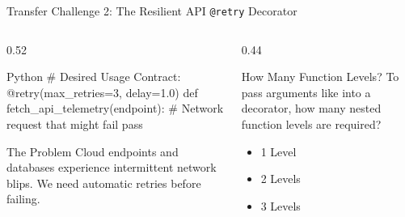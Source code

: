 \begin{frame}[fragile]{Transfer Challenge 2: The Resilient API \texttt{@retry} Decorator}
  \begin{columns}[T,onlytextwidth]
    \begin{column}{0.52\textwidth}
      \begin{CodeBlock}{Python}
# Desired Usage Contract:
@retry(max_retries=3, delay=1.0)
def fetch_api_telemetry(endpoint):
    # Network request that might fail
    pass
      \end{CodeBlock}
      \vspace{0.08cm}
      \begin{ConceptBox}{The Problem}
        \scriptsize Cloud endpoints and databases experience intermittent network blips. We need automatic retries before failing.
      \end{ConceptBox}
    \end{column}
    \begin{column}{0.44\textwidth}
      \begin{QuestionBox}{How Many Function Levels?}
        \scriptsize To pass arguments like  into a decorator, how many nested function levels are required?
        \begin{itemize}\setlength{\itemsep}{0.08cm}
          \item[\textbf{A)}] 1 Level
          \item[\textbf{B)}] 2 Levels
          \item[\textbf{C)}] 3 Levels
        \end{itemize}
      \end{QuestionBox}
    \end{column}
  \end{columns}
\end{frame}

